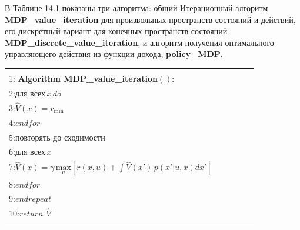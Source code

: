 \documentclass[10pt,a4paper]{article}
\begin{document}
В Таблице 14.1 показаны три алгоритма: общий Итерационный алгоритм \textbf{MDP\_value\_iteration} для произвольных пространств состояний и действий, его дискретный вариант для конечных пространств состояний \textbf{MDP\_discrete\_value\_iteration}, и алгоритм получения оптимального управляющего действия из функции дохода, \textbf{policy\_MDP}. 

\begin{table}[H]
\begin{center}
\begin{tabular}{|l|}
\hline
{}\\
1:\textbf{ Algorithm MDP\_value\_iteration}$():\qquad\qquad\quad\qquad\qquad$\\
2:\hspace{5mm}$\textit{для всех}\,x\,\textit{do}$\\
3:\hspace{10mm}$\hat{V}(x)=r_{\min}$\\
4:\hspace{5mm}$\textit{endfor}$\\
5:\hspace{5mm}$\textit{повторять до сходимости}$\\
6:\hspace{10mm}$\textit{для всех}\,x$\\
7:\hspace{15mm}$\hat{V}(x)=\gamma\,\underset{u}{\text{max}}\left[r(x,u)+\int \hat{V}(x')\,p(x'|u,x)dx' \right]$\\
8:\hspace{10mm}$\textit{endfor}$\\
9:\hspace{5mm}$\textit{endrepeat}$\\
10:\hspace{5mm}$\textit{return}\,\,\hat{V}$\\
{}\\
\hline
\end{tabular}
\end{center}
\end{table}
\end{document}
